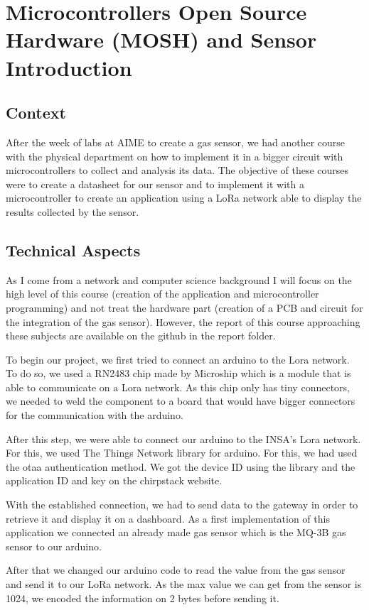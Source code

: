 \section{Microcontrollers Open Source Hardware (MOSH) and Sensor Introduction}

\subsection{Context}

After the week of labs at AIME to create a gas sensor, we had another course with the physical department on how to implement it in a bigger circuit with microcontrollers to collect and analysis its data. The objective of these courses were to create a datasheet for our sensor and to implement it with a microcontroller to create an application using a LoRa network able to display the results collected by the sensor.  

\subsection{Technical Aspects}

As I come from a network and computer science background I will focus on the high level of this course (creation of the application and microcontroller programming) and not treat the hardware part (creation of a PCB and circuit for the integration of the gas sensor). However, the report of this course approaching these subjects are available on the github in the report folder.
\\\par

To begin our project, we first tried to connect an arduino to the Lora network. To do so, we used a RN2483 chip made by Microship which is a module that is able to communicate on a Lora network. As this chip only has tiny connectors, we needed to weld the component to a board that would have bigger connectors for the communication with the arduino.
\par
After this step, we were able to connect our arduino to the INSA's Lora network. For this, we used The Things Network library for arduino. For this, we had used the otaa authentication method. We got the device ID using the library and the application ID and key on the chirpstack website.
\par
With the established connection, we had to send data to the gateway in order to retrieve it and display it on a dashboard. As a first implementation of this application we connected an already made gas sensor which is the MQ-3B gas sensor to our arduino.
\par
After that we changed our arduino code to read the value from the gas sensor and send it to our LoRa network. As the max value we can get from the sensor is 1024, we encoded the information on 2 bytes before sending it.
\\\par


